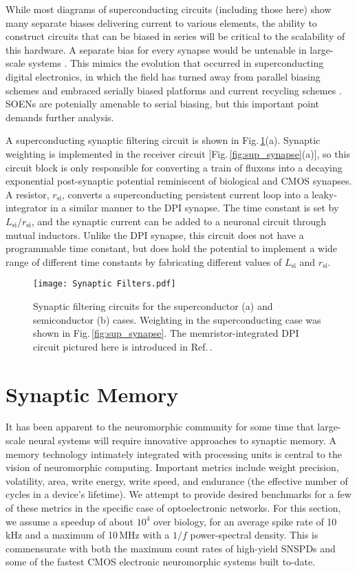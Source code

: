 \documentclass[twocolumn]{article}
\begin{document}
While most diagrams of superconducting circuits (including those here) show many separate biases delivering current to various elements, the ability to construct circuits that can be biased in series will be critical to the scalability of this hardware. A separate bias for every synapse would be untenable in large-scale systems \cite{tolpygo2016superconductor}. This mimics the evolution that occurred in superconducting digital electronics, in which the field has turned away from parallel biasing schemes and embraced serially biased platforms \cite{tolpygo2016superconductor} and current recycling schemes \cite{kisa2011}. SOENs are potenially amenable to serial biasing, but this important point demands further analysis.

A superconducting synaptic filtering circuit is shown in Fig.\,\ref{fig:filtering}(a). Synaptic weighting is implemented in the receiver circuit [Fig.\,\ref{fig:sup_synapse}(a)], so this circuit block is only responsible for converting a train of fluxons into a decaying exponential post-synaptic potential reminiscent of biological and CMOS synapses. A resistor, $r_{\mathrm{si}}$, converts a superconducting persistent current loop into a leaky-integrator in a similar manner to the DPI synapse. The time constant is set by $L_{\mathrm{si}}/r_{\mathrm{si}}$, and the synaptic current can be added to a neuronal circuit through mutual inductors. Unlike the DPI synapse, this circuit does not have a programmable time constant, but does hold the potential to implement a wide range of different time constants by fabricating different values of $L_{\mathrm{si}}$ and $r_{\mathrm{si}}$.
\begin{figure}[h!]
    \centering
    \texttt{[image: Synaptic Filters.pdf]}
    \caption{Synaptic filtering circuits for the superconductor (a) and semiconductor (b) cases. Weighting in the superconducting case was shown in Fig.\,\ref{fig:sup_synapse}. The memristor-integrated DPI circuit pictured here is introduced in Ref.\,. }
    \label{fig:filtering}
\end{figure}

\section{\label{sec:memory}Synaptic Memory}
It has been apparent to the neuromorphic community for some time that large-scale neural systems will require innovative approaches to synaptic memory. A memory technology intimately integrated with processing units is central to the vision of neuromorphic computing. Important metrics include weight precision, volatility, area, write energy, write speed, and endurance (the effective number of cycles in a device's lifetime). We attempt to provide desired benchmarks for a few of these metrics in the specific case of optoelectronic networks. For this section, we assume a speedup of about $10^4$ over biology, for an average spike rate of 10\,kHz and a maximum of 10\,MHz with a $1/f$ power-spectral density. This is commensurate with both the maximum count rates of high-yield SNSPDs and some of the fastest CMOS electronic neuromorphic systems built to-date.
\end{document}

